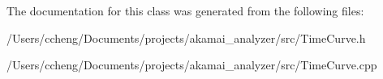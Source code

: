 The documentation for this class was generated from the following files\+:\begin{DoxyCompactItemize}
\item 
/\+Users/ccheng/\+Documents/projects/akamai\+\_\+analyzer/src/Time\+Curve.\+h\item 
/\+Users/ccheng/\+Documents/projects/akamai\+\_\+analyzer/src/Time\+Curve.\+cpp\end{DoxyCompactItemize}
